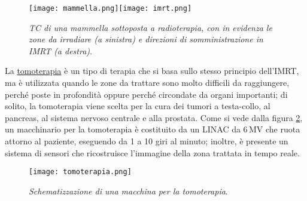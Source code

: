 \documentclass{report}
\newcommand{\figref}[1]{figura \ref{#1}}
\numberwithin{equation}{section}
\numberwithin{figure}{section}
\begin{document}
\begin{figure}[htp]
\centering
\texttt{[image: mammella.png]}\quad\texttt{[image: imrt.png]}
\caption{\label{fig:mammella} \textit{TC di una mammella sottoposta a radioterapia, con in evidenza le zone da irradiare (a sinistra) e direzioni di somministrazione in IMRT (a destra)}.}
\end{figure}
\vspace{-9 pt}
La \underline{tomoterapia} è un tipo di terapia che si basa sullo stesso principio dell'IMRT, ma è utilizzata quando le zone da trattare sono molto difficili da raggiungere, perché poste in profondità oppure perché circondate da organi importanti; di solito, la tomoterapia viene scelta per la cura dei tumori a testa-collo, al pancreas, al sistema nervoso centrale e alla prostata. Come si vede dalla \figref{fig:tomoterapia}, un macchinario per la tomoterapia è costituito da un LINAC da 6\,MV che ruota attorno al paziente, eseguendo da 1 a 10 giri al minuto; inoltre, è presente un sistema di sensori che ricostruisce l'immagine della zona trattata in tempo reale.

\begin{figure}[htp]
\centering
\texttt{[image: tomoterapia.png]}
\caption{\label{fig:tomoterapia} \textit{Schematizzazione di una macchina per la tomoterapia}.}
\end{figure}
\end{document}
